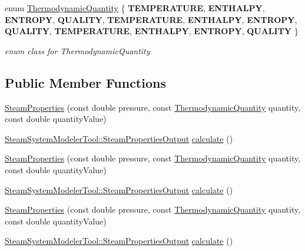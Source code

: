 \begin{DoxyCompactItemize}
\item 
\mbox{\label{class_steam_properties_ae0294bedf7d178c2d8fb6aed0f62fbff}} 
enum \hyperlink{class_steam_properties_ae0294bedf7d178c2d8fb6aed0f62fbff}{Thermodynamic\+Quantity} \{ \newline
{\bfseries T\+E\+M\+P\+E\+R\+A\+T\+U\+RE}, 
{\bfseries E\+N\+T\+H\+A\+L\+PY}, 
{\bfseries E\+N\+T\+R\+O\+PY}, 
{\bfseries Q\+U\+A\+L\+I\+TY}, 
\newline
{\bfseries T\+E\+M\+P\+E\+R\+A\+T\+U\+RE}, 
{\bfseries E\+N\+T\+H\+A\+L\+PY}, 
{\bfseries E\+N\+T\+R\+O\+PY}, 
{\bfseries Q\+U\+A\+L\+I\+TY}, 
\newline
{\bfseries T\+E\+M\+P\+E\+R\+A\+T\+U\+RE}, 
{\bfseries E\+N\+T\+H\+A\+L\+PY}, 
{\bfseries E\+N\+T\+R\+O\+PY}, 
{\bfseries Q\+U\+A\+L\+I\+TY}
 \}\begin{DoxyCompactList}\small\item\em enum class for Thermodynamic\+Quantity \end{DoxyCompactList}
\end{DoxyCompactItemize}
\subsection*{Public Member Functions}
\begin{DoxyCompactItemize}
\item 
\hyperlink{class_steam_properties_a976e08ed0433943d469a8c2f75d2ac68}{Steam\+Properties} (const double pressure, const \hyperlink{class_steam_properties_ae0294bedf7d178c2d8fb6aed0f62fbff}{Thermodynamic\+Quantity} quantity, const double quantity\+Value)
\item 
\hyperlink{struct_steam_system_modeler_tool_1_1_steam_properties_output}{Steam\+System\+Modeler\+Tool\+::\+Steam\+Properties\+Output} \hyperlink{class_steam_properties_a8c729e006c34157435d5476fb31e30b5}{calculate} ()
\item 
\hyperlink{class_steam_properties_a976e08ed0433943d469a8c2f75d2ac68}{Steam\+Properties} (const double pressure, const \hyperlink{class_steam_properties_ae0294bedf7d178c2d8fb6aed0f62fbff}{Thermodynamic\+Quantity} quantity, const double quantity\+Value)
\item 
\hyperlink{struct_steam_system_modeler_tool_1_1_steam_properties_output}{Steam\+System\+Modeler\+Tool\+::\+Steam\+Properties\+Output} \hyperlink{class_steam_properties_a8c729e006c34157435d5476fb31e30b5}{calculate} ()
\item 
\hyperlink{class_steam_properties_a976e08ed0433943d469a8c2f75d2ac68}{Steam\+Properties} (const double pressure, const \hyperlink{class_steam_properties_ae0294bedf7d178c2d8fb6aed0f62fbff}{Thermodynamic\+Quantity} quantity, const double quantity\+Value)
\item 
\hyperlink{struct_steam_system_modeler_tool_1_1_steam_properties_output}{Steam\+System\+Modeler\+Tool\+::\+Steam\+Properties\+Output} \hyperlink{class_steam_properties_a8c729e006c34157435d5476fb31e30b5}{calculate} ()
\end{DoxyCompactItemize}


